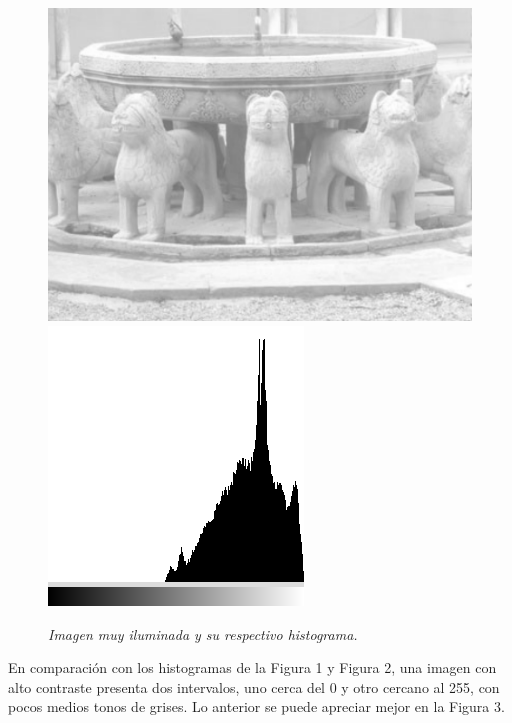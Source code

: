\documentclass[conference]{IEEEtran}
\begin{document}
\begin{figure}[h]
	\begin{center}
		\setlength{\unitlength}{0.00105in}
		\includegraphics[scale=0.35]{./images/fuente.png}
		\includegraphics[scale=0.368]{./images/figure1_2.png}
	\end{center}
	\caption{\emph{ Imagen muy iluminada y su respectivo histograma.}}
\end{figure}
\newpage
En comparaci\'on con los histogramas de la Figura 1 y Figura 2, una imagen con alto contraste presenta dos intervalos, uno cerca del 0 y otro cercano al 255, con pocos medios tonos de grises. Lo anterior se puede apreciar mejor en la Figura 3.
\end{document}
